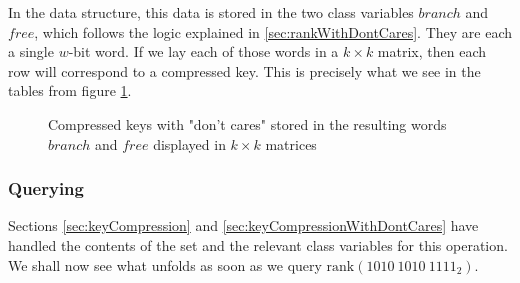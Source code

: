 In the data structure, this data is stored in the two class variables $branch$ and $free$, which follows the logic explained in \ref{sec:rankWithDontCares}. They are each a single $w$-bit word. If we lay each of those words in a $k \times k$ matrix, then each row will correspond to a compressed key. This is precisely what we see in the tables from figure \ref{fig:branchAndFreeCompressedKeys}.%

\begin{figure}[H]
\centering

\caption[Example of how the compressed keys with "don't cares" are stored in the instance variables $branch$ and $free$]{Compressed keys with "don't cares" stored in the resulting words $branch$ and $free$ displayed in $k \times k$ matrices}
\label{fig:branchAndFreeCompressedKeys}
\end{figure}

% 

\subsubsection{Querying} \label{sec:rankDontCaresQuery}

Sections \ref{sec:keyCompression} and \ref{sec:keyCompressionWithDontCares} have handled the contents of the set and the relevant class variables for this operation. We shall now see what unfolds as soon as we query $\text{rank}(1010\ 1010\ 1111_2)$.

